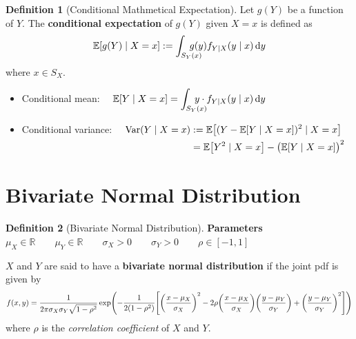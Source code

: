 \documentclass[10pt,UTF8]{article}
\newenvironment{definition box}
{\begin{tcolorbox}[colback=blue!5!white,colframe=blue!75!black,parbox=false,before upper=\par,before lower=\par]}
{\end{tcolorbox}}
\newenvironment{theorem box}
{\begin{tcolorbox}[colback=yellow!5!white,colframe=yellow!75!black,parbox=false,before upper=\par,before lower=\par]}
{\end{tcolorbox}}
\theoremstyle{definition}
\newtheorem{definition inner}{Definition}[section]
\newenvironment{definition}[1][]
{\begin{definition box}\begin{definition inner}[#1]\hfill\par}
{\end{definition inner}\end{definition box}}
\theoremstyle{plain}
\newtheorem{theorem inner}{Theorem}[section]
\theoremstyle{definition}
\newtheorem*{proof inner}{\textit{Proof}}
\theoremstyle{remark}
\newcommand{\E}[1]{\mathbb{E}\qty[#1]}  %
\newcommand{\Var}{\mathrm{Var}\qty}  %
\begin{document}
\begin{definition}[Conditional Mathmetical Expectation]
    Let $g(Y)$ be a function of $Y$. The \textbf{conditional expectation} of
    $g(Y)$ given $X=x$ is defined as
    \begin{equation*}
        \E{g(Y)\mid X=x} := \int_{S_Y(x)}\!\!\!\!\!\!\!\!\!g(y)f_{Y|X}(y\mid x)\dd{y}
    \end{equation*}
    where $x\in S_X$.
    \begin{itemize}
        \item Conditional mean:
            $\quad\displaystyle
            \E{Y\mid X=x} = \int_{S_Y(x)}\!\!\!\!\!\!\!\!\!y\cdot f_{Y|X}(y\mid x)\dd{y}$
            \item Conditional variance:
            $\quad \begin{aligned}[t]
                \Var(Y\mid X=x) &:= \E{(Y-\E{Y\mid X=x})^2\mid X=x} \\
                &= \E{Y^2\mid X=x} - \big(\E{Y\mid X=x}\big)^2
            \end{aligned}$
    \end{itemize}
\end{definition}


\section{Bivariate Normal Distribution}

\begin{definition}[Bivariate Normal Distribution]
    \textbf{Parameters}\qquad $\mu_X\in\mathbb{R} \qquad \mu_Y\in\mathbb{R} \qquad
    \sigma_X>0 \qquad \sigma_Y>0 \qquad \rho\in[-1,1]$

    $X$ and $Y$ are said to have a \textbf{bivariate normal distribution} if the joint pdf is given by
    \begin{gather*}
        f(x,y) = \frac{1}{2\pi\sigma_X\sigma_Y\sqrt{1-\rho^2}}
        \exp(-\frac{1}{2(1-\rho^2)}\qty[
            \qty(\frac{x-\mu_X}{\sigma_X})^2
            - 2\rho\qty(\frac{x-\mu_X}{\sigma_X})\qty(\frac{y-\mu_Y}{\sigma_Y})
            +\qty(\frac{y-\mu_Y}{\sigma_Y})^2
        ])
    \end{gather*}
    where $\rho$ is the \emph{correlation coefficient} of $X$ and $Y$.
\end{definition}
\end{document}
